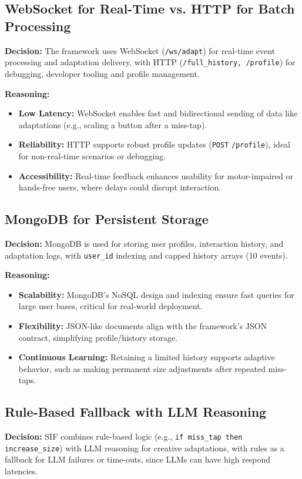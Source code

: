 \subsection{WebSocket for Real-Time vs. HTTP for Batch Processing}
\textbf{Decision:} The framework uses WebSocket (\texttt{/ws/adapt}) for real-time event processing and adaptation delivery, with HTTP (\texttt{/full\_history, /profile}) for debugging, developer tooling and profile management.

\textbf{Reasoning:}
\begin{itemize}
    \item \textbf{Low Latency:} WebSocket enables fast and bidirectional sending of data like adaptations (e.g., scaling a button after a miss-tap).
    \item \textbf{Reliability:} HTTP supports robust profile updates (\texttt{POST} \texttt{/profile}), ideal for non-real-time scenarios or debugging.
    \item \textbf{Accessibility:} Real-time feedback enhances usability for motor-impaired or hands-free users, where delays could disrupt interaction. 
\end{itemize}

\subsection{MongoDB for Persistent Storage}
\textbf{Decision:} MongoDB is used for storing user profiles, interaction history, and adaptation logs, with \texttt{user\_id} indexing and capped history arrays (10 events).

\textbf{Reasoning:}
\begin{itemize}
  \item \textbf{Scalability:} MongoDB’s NoSQL design and indexing ensure fast queries for large user bases, critical for real-world deployment.
  \item \textbf{Flexibility:} JSON-like documents align with the framework’s JSON contract, simplifying profile/history storage.
  \item \textbf{Continuous Learning:} Retaining a limited history supports adaptive behavior, such as making permanent size adjustments after repeated miss-taps.
\end{itemize}

\subsection{Rule-Based Fallback with LLM Reasoning}
\textbf{Decision:} SIF combines rule-based logic (e.g., \texttt{if miss\_tap then increase\_size}) with LLM reasoning for creative adaptations, with rules as a fallback for LLM failures or time-outs, since LLMs can have high respond latencies.

